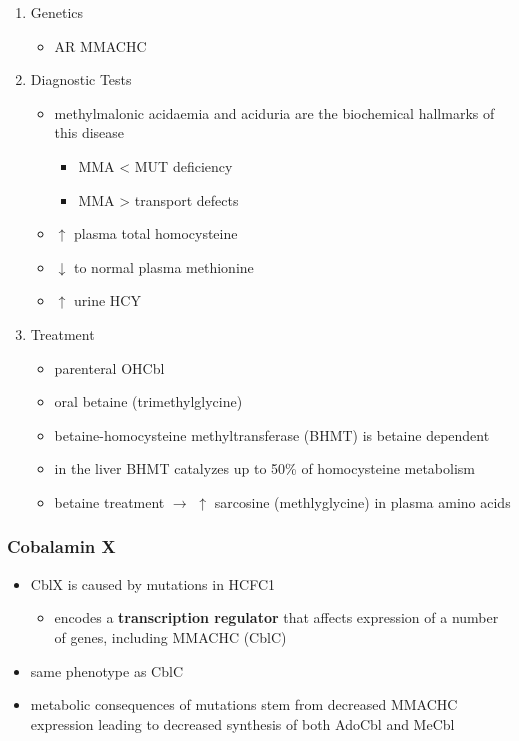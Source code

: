 \documentclass{scrartcl}
\begin{document}
\begin{enumerate}
\item Genetics
\label{sec:orgff3b5c1}
\begin{itemize}
\item AR MMACHC
\end{itemize}

\item Diagnostic Tests
\label{sec:org301622f}
\begin{itemize}
\item methylmalonic acidaemia and aciduria are the
biochemical hallmarks of this disease
\begin{itemize}
\item MMA \textless{} MUT deficiency
\item MMA \textgreater{} transport defects
\end{itemize}
\item \(\uparrow\) plasma total homocysteine
\item \(\downarrow\) to normal plasma methionine
\item \(\uparrow\) urine HCY
\end{itemize}

\item Treatment
\label{sec:org4797216}
\begin{itemize}
\item parenteral OHCbl
\item oral betaine (trimethylglycine)
\item betaine-homocysteine methyltransferase (BHMT) is betaine dependent
\end{itemize}
\begin{itemize}
\item in the liver BHMT catalyzes up to 50\% of homocysteine metabolism
\item betaine treatment \(\to\) \(\uparrow\) sarcosine (methlyglycine) in plasma amino acids
\end{itemize}
\end{enumerate}

\subsubsection{Cobalamin X}
\label{sec:org96b31e9}
\begin{itemize}
\item CblX is caused by mutations in HCFC1
\begin{itemize}
\item encodes a \textbf{transcription regulator} that affects expression of a
number of genes, including MMACHC (CblC)
\end{itemize}
\item same phenotype as CblC
\item metabolic consequences of mutations stem from decreased MMACHC
expression leading to decreased synthesis of both AdoCbl and MeCbl
\end{itemize}
\end{document}
